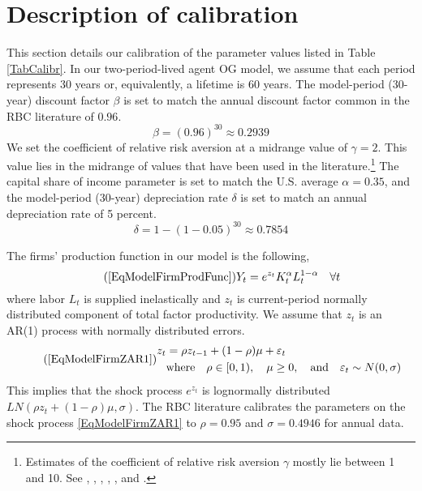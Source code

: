 \documentclass[letterpaper,12pt]{article}
\theoremstyle{definition}
\newcommand\ve{\varepsilon}
\begin{document}
\newpage
\setcounter{equation}{0}                         %
\section{Description of calibration}\label{SecTAppCalib}

  This section details our calibration of the parameter values listed in Table \ref{TabCalibr}. In our two-period-lived agent OG model, we assume that each period represents 30 years or, equivalently, a lifetime is 60 years. The model-period (30-year) discount factor $\beta$ is set to match the annual discount factor common in the RBC literature of $0.96$.
  \begin{equation}\label{EqTAppCalib_beta}
    \beta = (0.96)^{30}\approx 0.2939
  \end{equation}
  We set the coefficient of relative risk aversion at a midrange value of $\gamma=2$. This value lies in the midrange of values that have been used in the literature.\footnote{Estimates of the coefficient of relative risk aversion $\gamma$ mostly lie between 1 and 10. See \citet{MankiwZeldes:1991}, \citet{Blake:1996}, \citet{Campbell:1996}, \citet{Kocherlakota:1996}, \citet{BravConstantinidesGeczy:2002}, and \citet{MehraPrescott:1985}.} The capital share of income parameter is set to match the U.S. average $\alpha=0.35$, and the model-period (30-year) depreciation rate $\delta$ is set to match an annual depreciation rate of 5 percent.
  \begin{equation}\label{EqTAppCalib_delta}
    \delta = 1 - (1 - 0.05)^{30}\approx 0.7854
  \end{equation}

  The firms' production function in our model is the following,
  \begin{equation}\tag{\ref{EqModelFirmProdFunc}}
    Y_t = e^{z_t}K_t^\alpha L_t^{1-\alpha} \quad\forall t
  \end{equation}
  where labor $L_t$ is supplied inelastically and $z_t$ is current-period normally distributed component of total factor productivity. We assume that $z_t$ is an AR(1) process with normally distributed errors.
  \begin{equation}\tag{\ref{EqModelFirmZAR1}}
    \begin{split}
      z_t &= \rho z_{t-1} + (1-\rho)\mu + \ve_t \\
      &\text{where}\quad \rho\in[0,1), \quad\mu\geq 0, \quad\text{and}\quad \ve_t \sim N(0,\sigma)
    \end{split}
  \end{equation}
  This implies that the shock process $e^{z_t}$ is lognormally distributed $LN(\rho z_t + (1-\rho)\mu,\sigma)$. The RBC literature calibrates the parameters on the shock process \eqref{EqModelFirmZAR1} to $\rho=0.95$ and $\sigma = 0.4946$ for annual data.
\end{document}
